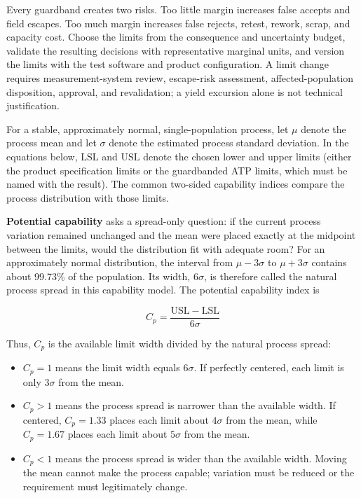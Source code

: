 Every guardband creates two risks. Too little margin increases false accepts and
field escapes. Too much margin increases false rejects, retest, rework, scrap,
and capacity cost. Choose the limits from the consequence and uncertainty
budget, validate the resulting decisions with representative marginal units,
and version the limits with the test software and product configuration. A
limit change requires measurement-system review, escape-risk assessment,
affected-population disposition, approval, and revalidation; a yield excursion
alone is not technical justification.

For a stable, approximately normal, single-population process, let $\mu$ denote
the process mean and let $\sigma$ denote the estimated process standard
deviation. In the equations below, $\mathrm{LSL}$ and $\mathrm{USL}$ denote the
chosen lower and upper limits (either the product specification limits or the
guardbanded ATP limits, which must be named with the result). The common
two-sided capability indices compare the process distribution with those
limits.

\textbf{Potential capability} asks a spread-only question: if the current
process variation remained unchanged and the mean were placed exactly at the
midpoint between the limits, would the distribution fit with adequate room?
For an approximately normal distribution, the interval from $\mu-3\sigma$ to
$\mu+3\sigma$ contains about 99.73\% of the population. Its width,
$6\sigma$, is therefore called the natural process spread in this capability
model. The potential capability index is

\begin{equation}
C_p=\frac{\mathrm{USL}-\mathrm{LSL}}{6\sigma}
\end{equation}

Thus, $C_p$ is the available limit width divided by the natural process spread:
\begin{itemize}
\item $C_p=1$ means the limit width equals $6\sigma$. If perfectly centered,
      each limit is only $3\sigma$ from the mean.
\item $C_p>1$ means the process spread is narrower than the available width.
      If centered, $C_p=1.33$ places each limit about $4\sigma$ from the mean,
      while $C_p=1.67$ places each limit about $5\sigma$ from the mean.
\item $C_p<1$ means the process spread is wider than the available width. Moving
      the mean cannot make the process capable; variation must be reduced or
      the requirement must legitimately change.
\end{itemize}

